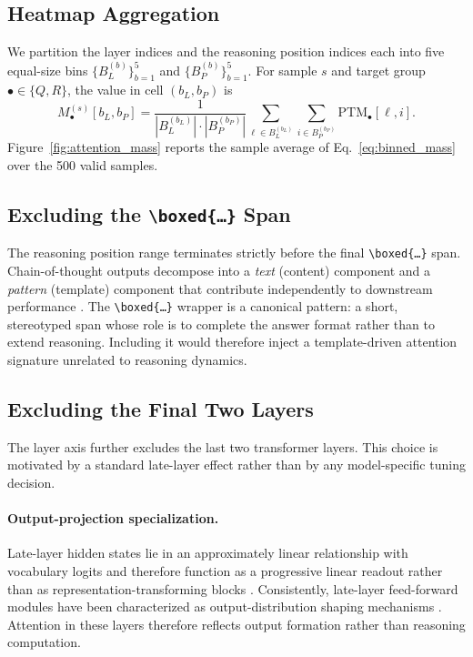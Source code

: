 \subsection{Heatmap Aggregation}

We partition the layer indices and the reasoning position indices each into five equal-size bins $\{B_L^{(b)}\}_{b=1}^{5}$ and $\{B_P^{(b)}\}_{b=1}^{5}$. For sample $s$ and target group $\bullet \in \{Q, R\}$, the value in cell $(b_L, b_P)$ is
\begin{equation}
M^{(s)}_{\bullet}[b_L, b_P] = \frac{1}{|B_L^{(b_L)}| \cdot |B_P^{(b_P)}|} \sum_{\ell \in B_L^{(b_L)}} \sum_{i \in B_P^{(b_P)}} \mathrm{PTM}_{\bullet}[\ell, i].
\label{eq:binned_mass}
\end{equation}
Figure~\ref{fig:attention_mass} reports the sample average of Eq.~\eqref{eq:binned_mass} over the 500 valid samples.

\subsection{Excluding the \texttt{\textbackslash boxed\{\ldots\}} Span}

The reasoning position range terminates strictly before the final \texttt{\textbackslash boxed\{\ldots\}} span. Chain-of-thought outputs decompose into a \textit{text} (content) component and a \textit{pattern} (template) component that contribute independently to downstream performance \citep{madaan2022text}. The \texttt{\textbackslash boxed\{\ldots\}} wrapper is a canonical pattern: a short, stereotyped span whose role is to complete the answer format rather than to extend reasoning. Including it would therefore inject a template-driven attention signature unrelated to reasoning dynamics.

\subsection{Excluding the Final Two Layers}

The layer axis further excludes the last two transformer layers. This choice is motivated by a standard late-layer effect rather than by any model-specific tuning decision.

\paragraph{Output-projection specialization.}
Late-layer hidden states lie in an approximately linear relationship with vocabulary logits and therefore function as a progressive linear readout rather than as representation-transforming blocks \citep{belrose2023eliciting}. Consistently, late-layer feed-forward modules have been characterized as output-distribution shaping mechanisms \citep{geva2021transformer}. Attention in these layers therefore reflects output formation rather than reasoning computation.

